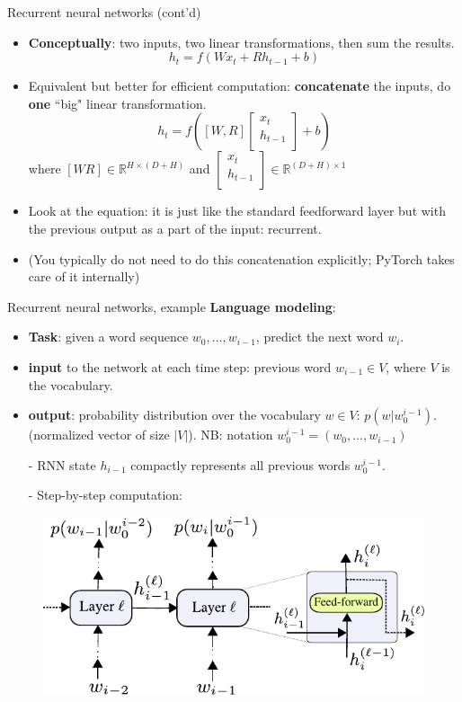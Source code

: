 \begin{frame}{Recurrent neural networks (cont'd)}
\begin{itemize}
\item \textbf{Conceptually}: two inputs, two linear transformations, then sum the results.
\[
h_t = f(W x_t + R h_{t-1} + b)
\]
\item Equivalent but better for efficient computation: \textbf{concatenate} the inputs, do \textbf{one} ``big" linear transformation.
\[
h_t = f( [W, R] 
      \begin{bmatrix}
           x_t \\
           h_{t-1} \\
         \end{bmatrix}
 + b)
\]
where $[W R] \in \mathbb{R}^{H \times (D+H)}$ and
$ \begin{bmatrix} x_t \\ h_{t-1} \\ \end{bmatrix} \in \mathbb{R}^{(D+H) \times 1}$ 
\item Look at the equation: it is just like the standard feedforward layer but with the previous output as a part of the input: recurrent.
\item (You typically do not need to do this concatenation explicitly; PyTorch takes care of it internally)
\end{itemize}
\end{frame}


\begin{frame}{Recurrent neural networks, example}
\vspace{-5mm}
\textbf{Language modeling}:
\vsp
\begin{itemize}
\item \textbf{Task}: given a word sequence $w_0, ..., w_{i-1}$, predict the next word $w_i$.
\item \textbf{input} to the network at each time step: previous word $w_{i-1} \in V$, where $V$ is the vocabulary.
\item \textbf{output}: probability distribution over the vocabulary $w \in V$: $p(w | w_0^{i-1})$.\\ (normalized vector of size $|V|$). NB: notation $w_0^{i-1} = (w_0, ..., w_{i-1})$
\item[-] RNN state $h_{i-1}$ compactly represents  all previous words $w_0^{i-1}$.
\item[-] Step-by-step computation:
\end{itemize}
\begin{figure}
                        \centering
                        \includegraphics[width=.65\linewidth]{./figures/rnn_lm.pdf}
\end{figure}
\end{frame}


